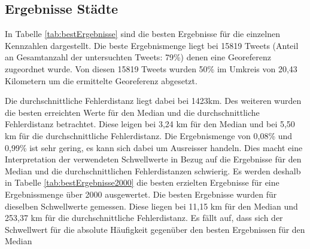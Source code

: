 				\subsection{Ergebnisse Städte}

			In Tabelle \ref{tab:bestErgebnisse} sind die besten Ergebnisse für die einzelnen Kennzahlen dargestellt.
			Die beste Ergebnismenge liegt bei 15819 Tweets (Anteil an Gesamtanzahl der untersuchten Tweets: 79\%) denen eine Georeferenz zugeordnet wurde. 
			Von diesen 15819 Tweets wurden 50\% im Umkreis von 20,43 Kilometern um die ermittelte Georeferenz abgesetzt.

			Die durchschnittliche Fehlerdistanz liegt dabei bei 1423km. 
			Des weiteren wurden die besten erreichten Werte für den Median und die durchschnittliche Fehlerdistanz betrachtet.
			Diese leigen bei 3,24 km für den Median und bei 5,50 km für die durchschnittliche Fehlerdistanz.
			Die Ergebnismenge von 0,08\% und 0,99\% ist sehr gering, es kann sich dabei um Ausreisser handeln.
			Dies macht eine Interpretation der verwendeten Schwellwerte in Bezug auf die Ergebnisse für den Median und die durchschnittlichen Fehlerdistanzen schwierig. 
			Es werden deshalb in Tabelle \ref{tab:bestErgebnisse2000} die besten erzielten Ergebnisse für eine Ergebnissmenge über 2000 ausgewertet.
			Die besten Ergebnisse wurden für dieselben Schwellwerte gemessen. 
			Diese liegen bei 11,15 km für den Median und 253,37 km für die durchschnittliche Fehlerdistanz.
			Es fällt auf, dass sich der Schwellwert für die absolute Häufigkeit gegenüber den besten Ergebnissen für den Median 

			

